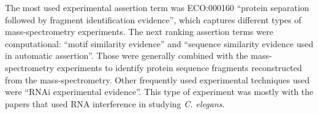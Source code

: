 \documentclass[12pt]{article}
\begin{document}
The most used experimental assertion term was ECO:000160 ``protein separation followed by fragment
identification evidence'', which captures different types of mass-spectrometry experiments.  The
next ranking assertion terms were computational: ``motif similarity evidence'' and ``sequence
similarity evidence used in automatic assertion''.  Those were generally combined with the
mass-spectrometry experiments to identify protein sequence fragments reconstructed from the
mass-spectrometry. Other frequently used experimental techniques used were ``RNAi experimental
evidence''. This type of experiment was mostly with the papers that used RNA interference in
studying \textit{C. elegans}. 

% 
% 
% 
% 
\end{document}
